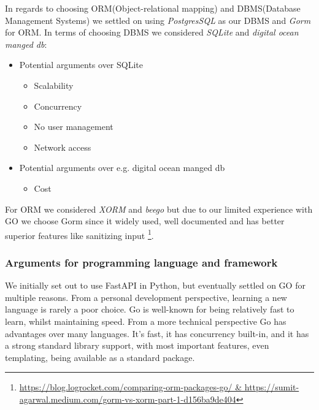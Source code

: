 In regards to choosing ORM(Object-relational mapping) and DBMS(Database Management Systems) we settled on 
using \textit{PostgresSQL} as our DBMS and \textit{Gorm} for ORM. In terms of choosing DBMS we considered 
\textit{SQLite} and \textit{digital ocean manged db}:
\begin{itemize}
    \item Potential arguments over SQLite 
    \begin{itemize}
        \item Scalability
        \item Concurrency
        \item No user management
        \item Network access        
    \end{itemize}
    \item Potential arguments over e.g. digital ocean manged db
    \begin{itemize}
        \item Cost
    \end{itemize}
\end{itemize}

For ORM we considered \textit{XORM} and \textit{beego} but due to our limited experience with GO we choose Gorm 
since it widely used, well documented and has better superior features like sanitizing input \footnote{\url{https://blog.logrocket.com/comparing-orm-packages-go/ & https://sumit-agarwal.medium.com/gorm-vs-xorm-part-1-d156ba9de404}}.

\subsubsection{Arguments for programming language and framework}

We initially set out to use FastAPI in Python, but eventually settled on GO for multiple reasons. From a personal development perspective, learning a new language is rarely a poor choice. Go is well-known for being relatively fast to learn, whilst maintaining speed. From a more technical perspective Go has advantages over many languages. It's fast, it has concurrency built-in, and it has a strong standard library support, with most important features, even templating, being available as a standard package.

